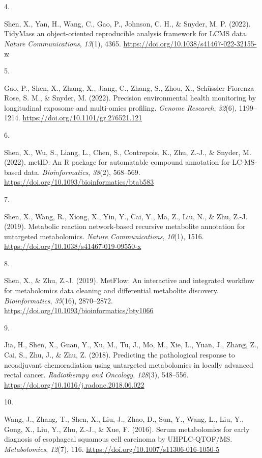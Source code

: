 \documentclass[11pt,a4paper,]{moderncv}
\newlength{\csllabelwidth}
\newcommand{\CSLLeftMargin}[1]{\parbox[t]{\csllabelwidth}{#1}}
\newcommand{\CSLRightInline}[1]{\parbox[t]{\linewidth - \csllabelwidth}{#1}}
\begin{document}
\leavevmode{}%
\CSLLeftMargin{4. }%
\CSLRightInline{Shen, X., Yan, H., Wang, C., Gao, P., Johnson, C. H., \&
Snyder, M. P. (2022). TidyMass an object-oriented reproducible analysis
framework for LCMS data. \emph{Nature Communications}, \emph{13}(1),
4365. \url{https://doi.org/10.1038/s41467-022-32155-w}}

\leavevmode{}%
\CSLLeftMargin{5. }%
\CSLRightInline{Gao, P., Shen, X., Zhang, X., Jiang, C., Zhang, S.,
Zhou, X., Schüssler-Fiorenza Rose, S. M., \& Snyder, M. (2022).
Precision environmental health monitoring by longitudinal exposome and
multi-omics profiling. \emph{Genome Research}, \emph{32}(6), 1199--1214.
\url{https://doi.org/10.1101/gr.276521.121}}

\leavevmode{}%
\CSLLeftMargin{6. }%
\CSLRightInline{Shen, X., Wu, S., Liang, L., Chen, S., Contrepois, K.,
Zhu, Z.-J., \& Snyder, M. (2022). metID: An R package for automatable
compound annotation for LC-MS-based data. \emph{Bioinformatics},
\emph{38}(2), 568--569.
\url{https://doi.org/10.1093/bioinformatics/btab583}}

\leavevmode{}%
\CSLLeftMargin{7. }%
\CSLRightInline{Shen, X., Wang, R., Xiong, X., Yin, Y., Cai, Y., Ma, Z.,
Liu, N., \& Zhu, Z.-J. (2019). Metabolic reaction network-based
recursive metabolite annotation for untargeted metabolomics.
\emph{Nature Communications}, \emph{10}(1), 1516.
\url{https://doi.org/10.1038/s41467-019-09550-x}}

\leavevmode{}%
\CSLLeftMargin{8. }%
\CSLRightInline{Shen, X., \& Zhu, Z.-J. (2019). MetFlow: An interactive
and integrated workflow for metabolomics data cleaning and differential
metabolite discovery. \emph{Bioinformatics}, \emph{35}(16), 2870--2872.
\url{https://doi.org/10.1093/bioinformatics/bty1066}}

\leavevmode{}%
\CSLLeftMargin{9. }%
\CSLRightInline{Jia, H., Shen, X., Guan, Y., Xu, M., Tu, J., Mo, M.,
Xie, L., Yuan, J., Zhang, Z., Cai, S., Zhu, J., \& Zhu, Z. (2018).
Predicting the pathological response to neoadjuvant chemoradiation using
untargeted metabolomics in locally advanced rectal cancer.
\emph{Radiotherapy and Oncology}, \emph{128}(3), 548--556.
\url{https://doi.org/10.1016/j.radonc.2018.06.022}}

\leavevmode{}%
\CSLLeftMargin{10. }%
\CSLRightInline{Wang, J., Zhang, T., Shen, X., Liu, J., Zhao, D., Sun,
Y., Wang, L., Liu, Y., Gong, X., Liu, Y., Zhu, Z.-J., \& Xue, F. (2016).
Serum metabolomics for early diagnosis of esophageal squamous cell
carcinoma by UHPLC-QTOF/MS. \emph{Metabolomics}, \emph{12}(7), 116.
\url{https://doi.org/10.1007/s11306-016-1050-5}}
\end{document}
